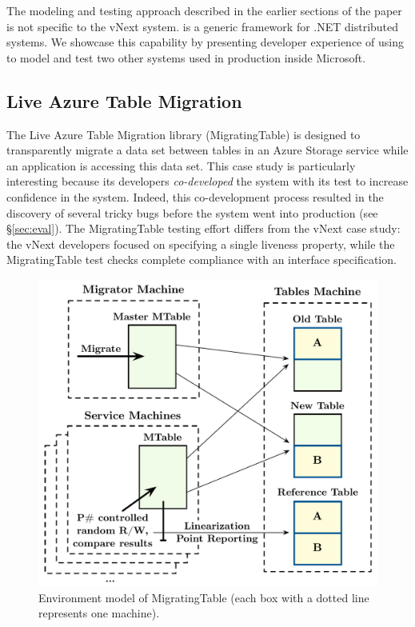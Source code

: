 The modeling and testing approach described in the earlier sections of the paper is not specific to the vNext system. \psharp is a generic framework for .NET distributed systems. We showcase this capability by presenting developer experience of using \psharp to model and test two other systems used in production inside Microsoft.

\subsection{Live Azure Table Migration}
\label{sec:cases:migration}

The Live Azure Table Migration library (MigratingTable) is designed to transparently migrate a data set between tables in an Azure Storage service while an application is accessing this data set. This case study is particularly interesting because its developers \emph{co-developed} the system with its \psharp test to increase confidence in the system. Indeed, this co-development process resulted in the discovery of several tricky bugs before the system went into production (see \S\ref{sec:eval}). The MigratingTable testing effort differs from the vNext case study: the vNext developers focused on specifying a single liveness property, while the MigratingTable test checks complete compliance with an interface specification.

\begin{figure}[t]
\centering
\includegraphics[width=\linewidth]{img/mocked_migration}
\caption{Environment model of MigratingTable (each box with a dotted line represents one \psharp machine).}
\label{fig:mockedmigration}
\end{figure}


